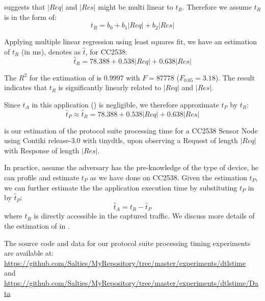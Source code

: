  suggests that $|Req|$ and $|Res|$ might be multi linear to $t_R$. Therefore we assume $t_R$ is in the form of:
\begin{equation} \label{Eq: tR est}
	t_R = b_0 + b_1|Req| + b_2|Res|
\end{equation}

Applying multiple linear regression using least squares fit, we have an estimation of $t_R$ (in ms), denotes as $\hat{t}$, for CC2538:
\begin{equation}
	\hat{t}_R = 78.388 + 0.538|Req| + 0.638|Res|
	\label{Eq: t_R estimation}
\end{equation}

The $R^2$ for the extimation of  is $0.9997$ with $F=87778$ ($F_{0.05} = 3.18$). The result indicates that $t_R$ is significantly linearly related to $|Req|$ and $|Res|$.

Since $t_A$ in this application () is negligible, we therefore approximate $t_P$ by $t_R$:
\begin{equation} \label{Eq: CC2538tP}
	\hat{t}_P \approx \hat{t}_R = 78.388 + 0.538|Req| + 0.638|Res|
\end{equation}

 is our estimation of the protocol suite processing time for a CC2538 Sensor Node using Contiki release-3.0 with tinydtls, upon observing a Request of length $|Req|$ with Response of length $|Res|$.

In practice, assume the adversary has the pre-knowledge of the type of device, he can profile and estimate $t_P$ as we have done on CC2538. Given the estimation $\hat{t}_P$, we can further estimate the the application execution time by substituting $t_P$ in  by $\hat{t}_P$:
\begin{equation} \label{Eq: hattA}
	\hat{t}_A = t_R - \hat{t}_P
\end{equation}
where $t_R$ is directly accessible in the captured traffic. We discuss more details of the estimation of  in .

The source code and data for our protocol suite processing timing experiments are available at: \\
\url{https://github.com/Salties/MyRepository/tree/master/experiments/dtlstime} \\
and \\
\url{https://github.com/Salties/MyRepository/tree/master/experiments/dtlstime/Data}

